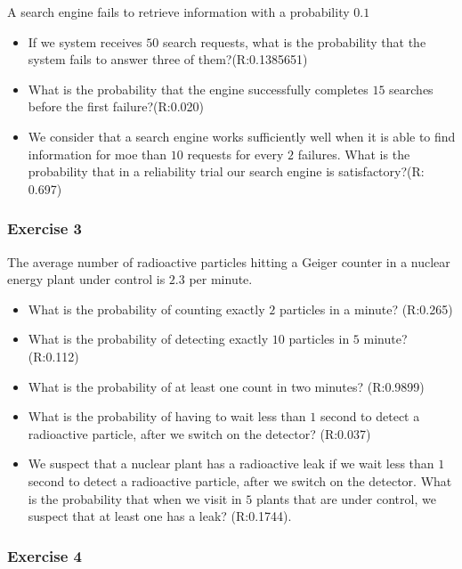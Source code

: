 \documentclass[
]{book}
\begin{document}
A search engine fails to retrieve information with a probability \(0.1\)

\begin{itemize}
\item
  If we system receives \(50\) search requests, what is the probability that the system fails to answer three of them?(R:0.1385651)
\item
  What is the probability that the engine successfully completes \(15\) searches before the first failure?(R:0.020)
\item
  We consider that a search engine works sufficiently well when it is able to find information for moe than \(10\) requests for every \(2\) failures. What is the probability that in a reliability trial our search engine is satisfactory?(R: 0.697)
\end{itemize}

\hypertarget{exercise-3-2}{%
\subsubsection{Exercise 3}\label{exercise-3-2}}

The average number of radioactive particles hitting a Geiger counter in a nuclear energy plant under control is \(2.3\) per minute.

\begin{itemize}
\item
  What is the probability of counting exactly \(2\) particles in a minute? (R:0.265)
\item
  What is the probability of detecting exactly \(10\) particles in \(5\) minute? (R:0.112)
\item
  What is the probability of at least one count in two minutes? (R:0.9899)
\item
  What is the probability of having to wait less than \(1\) second to detect a radioactive particle, after we switch on the detector? (R:0.037)
\item
  We suspect that a nuclear plant has a radioactive leak if we wait less than \(1\) second to detect a radioactive particle, after we switch on the detector. What is the probability that when we visit in \(5\) plants that are under control, we suspect that at least one has a leak? (R:0.1744).
\end{itemize}

\hypertarget{exercise-4-2}{%
\subsubsection{Exercise 4}\label{exercise-4-2}}
\end{document}
